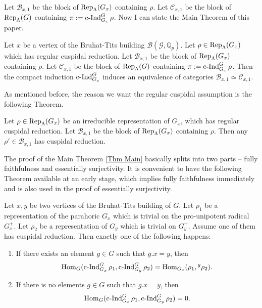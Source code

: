 	Let $\mathcal{B}_{x,1}$ be the block of $\operatorname{\operatorname{Rep}}_{\Lambda}(G_x)$ containing $\rho$. Let $\mathcal{C}_{x,1}$ be the block of $\operatorname{\operatorname{Rep}}_{\Lambda}(G)$ containing $\pi:=\operatorname{\operatorname{c-Ind}}_{G_x}^G\rho$. Now I can state the Main Theorem of this paper.
	
	\begin{theorem}\label{Thm Main}
		Let $x$ be a vertex of the Bruhat-Tits building $\mathcal{B}(\mathcal{G}, \mathbb{Q}_p)$. Let $\rho \in \operatorname{\operatorname{Rep}}_{\Lambda}(G_x)$ which has regular cuspidal reduction. Let $\mathcal{B}_{x,1}$ be the block of $\operatorname{\operatorname{Rep}}_{\Lambda}(G_x)$ containing $\rho$. Let $\mathcal{C}_{x,1}$ be the block of $\operatorname{\operatorname{Rep}}_{\Lambda}(G)$ containing $\pi:=\operatorname{\operatorname{c-Ind}}_{G_x}^G\rho$. Then the compact induction $\operatorname{\operatorname{c-Ind}}_{G_x}^G$ induces an equivalence of categories $\mathcal{B}_{x,1} \simeq \mathcal{C}_{x,1}$. 
	\end{theorem}
	
	As mentioned before, the reason we want the regular cuspidal assumption is the following Theorem. 
	
	\begin{theorem}\label{Thm Cusp Red}
		Let $\rho \in \operatorname{\operatorname{Rep}}_{\Lambda}(G_x)$ be an irreducible representation of $G_x$, which has regular cuspidal reduction. Let $\mathcal{B}_{x,1}$ be the block of $\operatorname{\operatorname{Rep}}_{\Lambda}(G_x)$ containing $\rho$. Then any $\rho' \in \mathcal{B}_{x,1}$ has cuspidal reduction.
	\end{theorem}
	
	The proof of the Main Theorem \ref{Thm Main} basically splits into two parts -- fully faithfulness and essentially surjectivity. It is convenient to have the following Theorem available at an early stage, which implies fully faithfulness immediately and is also used in the proof of essentially surjectivity.
	
	\begin{theorem}\label{Thm Hom}
		Let $x, y$ be two vertices of the Bruhat-Tits building of $G$. Let $\rho_1$ be a representation of the parahoric $G_x$ which is trivial on the pro-unipotent radical $G_x^+$. Let $\rho_2$ be a representation of $G_y$ which is trivial on $G_y^+$. Assume one of them has cuspidal reduction. Then exactly one of the following happens:
		\begin{enumerate}
			\item If there exists an element $g \in G$ such that $g.x=y$, then
			$$\operatorname{\operatorname{Hom}}_G(\operatorname{\operatorname{c-Ind}}_{G_x}^G\rho_1, \operatorname{\operatorname{c-Ind}}_{G_y}^G\rho_2)=\operatorname{\operatorname{Hom}}_{G_x}(\rho_1, {^g\rho_2}).$$
			\item If there is no elements $g \in G$ such that $g.x=y$, then
			$$\operatorname{\operatorname{Hom}}_G(\operatorname{\operatorname{c-Ind}}_{G_x}^G\rho_1, \operatorname{\operatorname{c-Ind}}_{G_y}^G\rho_2)=0.$$
		\end{enumerate}
	\end{theorem}
	
